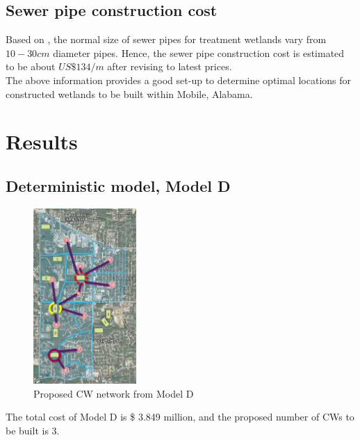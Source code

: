 \documentclass[preprint,12pt,authoryear]{elsarticle}
\begin{document}
\subsection{Sewer pipe construction cost} 
Based on \cite{kadlec2009}, the normal size of sewer pipes for treatment wetlands vary from $10-30 cm$ diameter pipes. Hence, the sewer pipe construction cost is estimated to be about $US\$134/m$ \citep{usepa2000} after revising to latest prices. \\

The above information provides a good set-up to determine optimal locations for constructed wetlands to be built within Mobile, Alabama. 

\section{Results}
\subsection{Deterministic model, Model D}
\begin{figure}[!htb]
	\centering
	\includegraphics[width=0.35\textwidth]{d.png}
	\caption{Proposed CW network from Model D}
	\label{fig:networkd}
\end{figure}

The total cost of Model D is \$ 3.849 million, and the proposed number of CWs to be built is 3.

\end{document}

